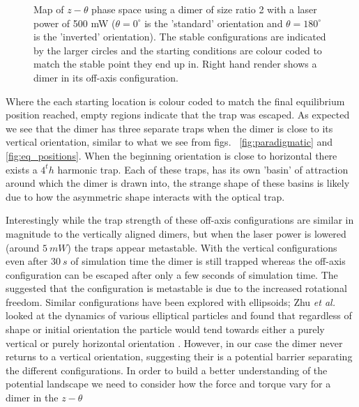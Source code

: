 \begin{figure}[h!]
\begin{subfigure}{0.32\linewidth}
	\end{subfigure}
	\caption{Map of $z-\theta$ phase space using a dimer 
		of size ratio 2 with a laser power of 500 mW 
		($\theta=0^\circ$ is the 'standard' orientation 
		and $\theta=180^\circ$ is the 'inverted' 
		orientation). The stable configurations are 
		indicated by the larger circles and the 
		starting conditions are colour coded to match 
		the stable point they end up in. Right hand 
		render shows a dimer in its off-axis configuration.}
	\label{fig:off_axis}
\end{figure}

Where the each starting location is colour coded to
match the final equilibrium position reached, empty
regions indicate that the trap was escaped. As 
expected we see that the dimer has three separate 
traps when the dimer is close to its vertical 
orientation, similar to what we see from figs.~
\ref{fig:paradigmatic} and \ref{fig:eq_positions}. 
When the beginning orientation is close to horizontal 
there exists a $4^th$ harmonic trap. Each of these 
traps, has its own 'basin' of attraction around 
which the dimer is drawn into, the strange shape 
of these basins is likely due to how the asymmetric 
shape interacts with the optical trap.

Interestingly while the trap strength of these off-axis 
configurations are similar in magnitude to the vertically 
aligned dimers, but when the laser power is lowered 
(around $5\ mW$) the traps appear metastable. With the 
vertical configurations even after $30\ s$ of simulation
time the dimer is still trapped whereas the off-axis 
configuration can be escaped after only a few seconds of
simulation time. The suggested that the configuration is 
metastable is due to the increased rotational freedom. 
Similar configurations have been explored with ellipsoids; 
Zhu \textit{et al.} looked at the dynamics of various 
elliptical particles and found that regardless of shape or 
initial orientation the particle would tend towards either 
a purely vertical or purely horizontal orientation 
\cite{Zhu2021}. However, in our case the dimer never returns
to a vertical orientation, suggesting their is a potential 
barrier separating the different configurations. In order
to build a better understanding of the potential landscape 
we need to consider how the force and torque vary for a 
dimer in the $z-\theta$

